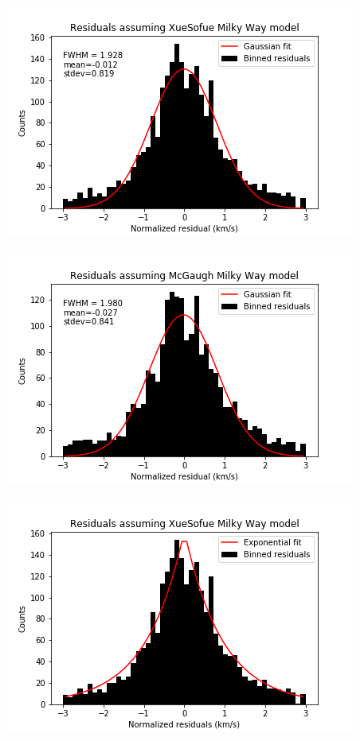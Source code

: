 \documentclass[reprint,%
 amsmath,amssymb,
 aps,
]{revtex4-1}
\begin{document}
    
\begin{figure}[h]
     \centering
     \begin{subfigure}[b]{0.475\textwidth}
         \centering
         \includegraphics[width=.8\linewidth]{figures/ResidualHist_GaussFit_v1_sinh_v2_cosh_sparc128_newnorm_XueSofue.png}
         \label{fig:XueSofue residuals gaussian fit}
     \end{subfigure}
     \begin{subfigure}[b]{0.475\textwidth}
         \centering
         \includegraphics[width=.8\linewidth]{figures/ResidualHist_GaussFit_v1_sinh_v2_cosh_sparc128_newnorm_McGaugh.png}
         \label{fig:McGaugh residuals gaussian fit}
     \end{subfigure}
     \begin{subfigure}[b]{0.475\textwidth}
         \centering
         \includegraphics[width=.8\linewidth]{figures/ResidualHist_ExpFit_v1_sinh_v2_cosh_sparc128_newnorm_XueSofue.png}

\end{subfigure}
\end{figure}
\end{document}
